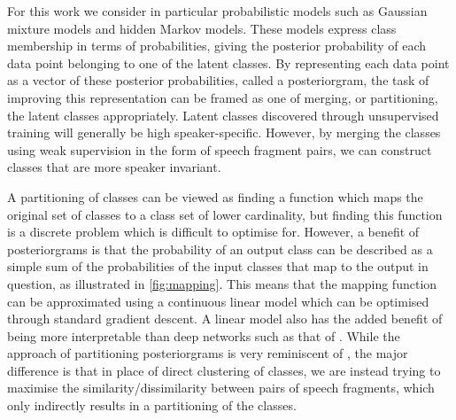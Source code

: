 For this work we consider in particular probabilistic models such as Gaussian mixture models and hidden Markov models.
These models express class membership in terms of probabilities, giving the posterior probability of each data point belonging to one of the latent classes.
By representing each data point as a vector of these posterior probabilities, called a posteriorgram, the task of improving this representation can be framed as one of merging, or partitioning, the latent classes appropriately.
Latent classes discovered through unsupervised training will generally be high speaker-specific.
However, by merging the classes using weak supervision in the form of speech fragment pairs, we can construct classes that are more speaker invariant.

A partitioning of classes can be viewed as finding a function which maps the original set of classes to a class set of lower cardinality, but finding this function is a discrete problem which is difficult to optimise for.
However, a benefit of posteriorgrams is that the probability of an output class can be described as a simple sum of the probabilities of the input classes that map to the output in question, as illustrated in \cref{fig:mapping}.
This means that the mapping function can be approximated using a continuous linear model which can be optimised through standard gradient descent.
A linear model also has the added benefit of being more interpretable than deep networks such as that of \textcite{thiolliere2015hybrid}.
While the approach of partitioning posteriorgrams is very reminiscent of \textcite{jansen2013weak}, the major difference is that in place of direct clustering of classes, we are instead trying to maximise the similarity/dissimilarity between pairs of speech fragments, which only indirectly results in a partitioning of the classes.

